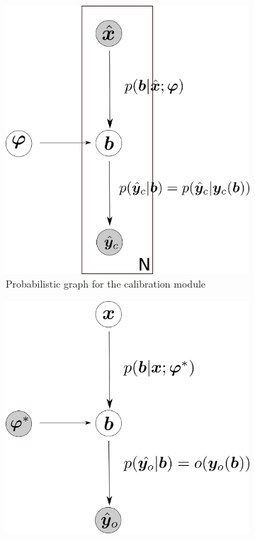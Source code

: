 \documentclass[a4paper,11pt]{article}
\begin{document}
\begin{figure}[!htpb]
\centering
\begin{subfigure}{0.4\textwidth}
    \includegraphics[width=\textwidth]{fig/Calibration_graph.png}
    \caption{Probabilistic graph for the calibration module}
    \label{fig:cal_graph}
\end{subfigure}
\hfill
\begin{subfigure}{0.4\textwidth}
    \includegraphics[width=\textwidth]{fig/Optimisation_graph.png}

\end{subfigure}
\end{figure}
\end{document}
